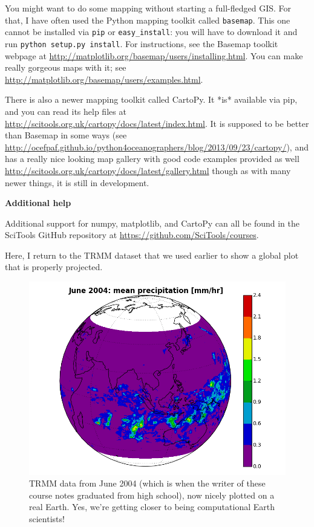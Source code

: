 \documentclass[a4paper,10pt]{scrartcl}
\begin{document}
You might want to do some mapping without starting a full-fledged GIS. For that, I have often used the Python mapping toolkit called \lstinline{basemap}. This one cannot be installed via \lstinline{pip} or \lstinline{easy_install}: you will have to download it and run \lstinline{python setup.py install}. For instructions, see the Basemap toolkit webpage at \url{http://matplotlib.org/basemap/users/installing.html}. You can make really gorgeous maps with it; see \url{http://matplotlib.org/basemap/users/examples.html}.

There is also a newer mapping toolkit called CartoPy. It *is* available via pip, and you can read its help files at \url{http://scitools.org.uk/cartopy/docs/latest/index.html}. It is supposed to be better than Basemap in some ways (see \url{http://ocefpaf.github.io/python4oceanographers/blog/2013/09/23/cartopy/}), and has a really nice looking map gallery with good code examples provided as well \url{http://scitools.org.uk/cartopy/docs/latest/gallery.html} though as with many newer things, it is still in development.

\begin{framed}
\noindent\textbf{Additional help}

Additional support for numpy, matplotlib, and CartoPy can all be found in the SciTools GitHub repository at \url{https://github.com/SciTools/courses}.
\end{framed}

Here, I return to the TRMM dataset that we used earlier to show a global plot that is properly projected.



\begin{figure}[!ht]
\begin{center}
\includegraphics[width=.9\linewidth]{figures/FilesData/EasternHemispherePrecip.png}
\end{center}
\caption{TRMM data from June 2004 (which is when the writer of these course notes graduated from high school), now nicely plotted on a real Earth. Yes, we're getting closer to being computational Earth scientists!}
\end{figure}
\end{document}

